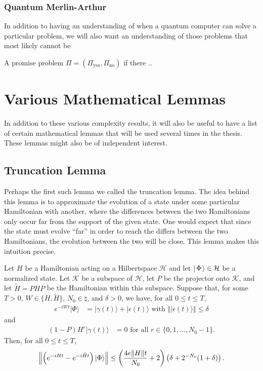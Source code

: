 \documentclass[../thesis-main/thesis-main]{subfiles}
\begin{document}
\subsubsection{Quantum Merlin-Arthur}

In addition to having an understanding of when a quantum computer can solve a particular problem, we will also want an understanding of those problems that most likely cannot be 


\begin{definition}[\QMA]  A promise problem $\Pi = (\Pi_{\text{yes}},\Pi_{\text{no}})$ if there ..

\end{definition}

\section{Various Mathematical Lemmas}

In addition to these various complexity results, it will also be useful to have a list of certain mathematical lemmas that will be used several times in the thesis.  These lemmas might also be of independent interest.
\subsection{Truncation Lemma}

Perhaps the first such lemma we called the truncation lemma.  The idea behind this lemma is to approximate the evolution of a state under some particular Hamiltonian with another, where the differences between the two Hamiltonians only occur far from the support of the given state.  One would expect that since the state must evolve ``far'' in order to reach the differs between the two Hamiltonians, the evolution between the two will be close.  This lemma makes this intuition precise.

\begin{lemma}
\label{lem:trunc}
Let $H$ be a Hamiltonian acting on a Hilbertspace $\mathcal{H}$ and let $|\mspace{2mu} \Phi \mspace{2mu} \rangle\in\mathcal{H}$ be a normalized state. Let
$\mathcal{K}$ be a subspace of $\mathcal{H}$, let $P$ be the projector onto $\mathcal{K}$,
and let $\tilde{H}=PHP$ be the Hamiltonian within this subspace. Suppose
that, for some $T>0$, $W\in\{H,\tilde{H}\}$, $N_0\in\natural$,
and $\delta>0$, we have, for all $0\leq t\leq T$, 
\begin{align*}
e^{-iWt}|\Phi\rangle & = |\gamma(t)\rangle+|\epsilon(t)\rangle \text{ with }
\left\Vert |\epsilon(t)\rangle\right\Vert \leq \delta
\end{align*}
and
\begin{align*}
  (1-P) H^{r}|\gamma(t)\rangle & = 0 \text{ for all } r\in\{0,1,\ldots, N_0-1\}.
\end{align*}
Then, for all $0\leq t \leq T$, 
\[
  \left\|{\left(e^{-iHt}-e^{-i\tilde{H}t}\right)|\Phi\rangle}\right\|
  \leq \left(\frac{4e\|{H}\|t}{N_0} + 2 \right) 
        \left(\delta + 2^{-N_0}(1+\delta)\right).
\]
\end{lemma}
\end{document}
